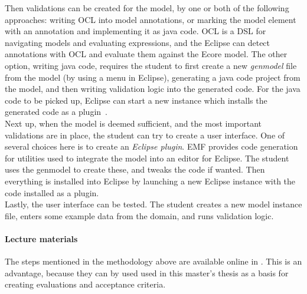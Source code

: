 Then validations can be created for the model, by one or both of the following approaches: writing \acrfull{OCL} into model annotations, or marking the model element with an annotation and implementing it as java code.
\Acrshort{OCL} is a \acrlong{DSL} for navigating models and evaluating expressions, and the \gls{Eclipse} can detect annotations with \acrshort{OCL} and evaluate them against the \gls{Ecore} model.
The other option, writing java code, requires the student to first create a new \textit{genmodel} file from the model (by using a menu in \gls{Eclipse}), generating a java code project from the model, and then writing validation logic into the generated code.
For the java code to be picked up, \gls{Eclipse} can start a new instance which installs the generated code as a plugin~\cite{hallvardtraettebergConstraintsValidationTDT42502020}.\\

Next up, when the model is deemed sufficient, and the most important validations are in place, the student can try to create a user interface.
One of several choices here is to create an \textit{\gls{Eclipse} plugin}.
\Acrshort{EMF} provides code generation for utilities used to integrate the model into an editor for \gls{Eclipse}.
The student uses the genmodel to create these, and tweaks the code if wanted.
Then everything is installed into \gls{Eclipse} by launching a new \gls{Eclipse} instance with the code installed as a plugin.\\

Lastly, the user interface can be tested.
The student creates a new model instance file, enters some example data from the domain, and runs validation logic.

\paragraph{Lecture materials}\label{par:tdt4250-confluence}
The steps mentioned in the methodology above are available online in \cite{hallvardtraettebergEMFStepbystepTDT42502017,hallvardtraettebergConstraintsValidationTDT42502020,hallvardtraettebergEditingEcoreModel2017,hallvardtraettebergGenmodelTDT4250NTNU2017}.
This is an advantage, because they can by used used in this master's thesis as a basis for creating evaluations and acceptance criteria.
